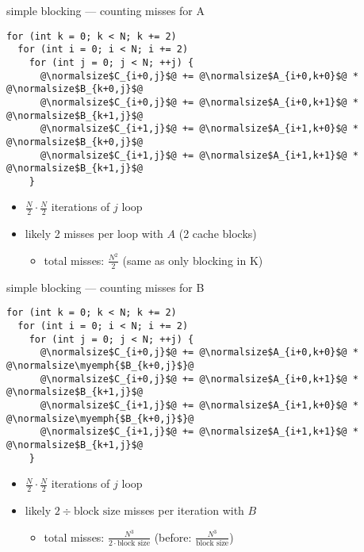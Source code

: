 \begin{frame}[fragile,label=cacheBlockExamplePartialMissesA]{simple blocking --- counting misses for A}
\lstset{style=small,language=C,escapechar=@}
\begin{lstlisting}
for (int k = 0; k < N; k += 2)
  for (int i = 0; i < N; i += 2)
    for (int j = 0; j < N; ++j) {
      @\normalsize$C_{i+0,j}$@ += @\normalsize$A_{i+0,k+0}$@ * @\normalsize$B_{k+0,j}$@
      @\normalsize$C_{i+0,j}$@ += @\normalsize$A_{i+0,k+1}$@ * @\normalsize$B_{k+1,j}$@
      @\normalsize$C_{i+1,j}$@ += @\normalsize$A_{i+1,k+0}$@ * @\normalsize$B_{k+0,j}$@
      @\normalsize$C_{i+1,j}$@ += @\normalsize$A_{i+1,k+1}$@ * @\normalsize$B_{k+1,j}$@
    }
\end{lstlisting}
\begin{itemize}
\item $\frac{N}{2}\cdot\frac{N}{2}$ iterations of $j$ loop
\item likely 2 misses per loop with $A$ (2 cache blocks)
    \begin{itemize}
    \item total misses: $\frac{N^2}{2}$ (same as only blocking in K)
    \end{itemize}
\end{itemize}
\end{frame}

\begin{frame}[fragile,label=cacheBlockExamplePartialMissesB]{simple blocking --- counting misses for B}
\lstset{style=small,language=C,escapechar=@}
\begin{lstlisting}
for (int k = 0; k < N; k += 2)
  for (int i = 0; i < N; i += 2)
    for (int j = 0; j < N; ++j) {
      @\normalsize$C_{i+0,j}$@ += @\normalsize$A_{i+0,k+0}$@ * @\normalsize\myemph{$B_{k+0,j}$}@
      @\normalsize$C_{i+0,j}$@ += @\normalsize$A_{i+0,k+1}$@ * @\normalsize$B_{k+1,j}$@
      @\normalsize$C_{i+1,j}$@ += @\normalsize$A_{i+1,k+0}$@ * @\normalsize\myemph{$B_{k+0,j}$}@
      @\normalsize$C_{i+1,j}$@ += @\normalsize$A_{i+1,k+1}$@ * @\normalsize$B_{k+1,j}$@
    }
\end{lstlisting}
\begin{itemize}
\item $\frac{N}{2}\cdot\frac{N}{2}$ iterations of $j$ loop
\item likely $2\div\text{block size}$ misses per iteration with $B$
    \begin{itemize}
    \item total misses: $\frac{N^3}{2\cdot\text{block size}}$ (before: $\frac{N^3}{\text{block size}}$)
    \end{itemize}
\end{itemize}
\end{frame}


